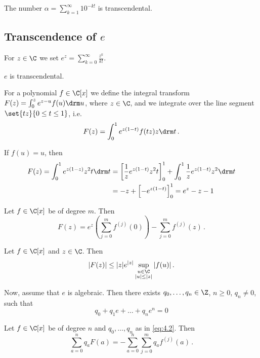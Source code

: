 \begin{thmn}
	The number \( \alpha = \sum_{k=1}^{\infty} 10^{-k!} \) is transcendental.
\end{thmn}

\subsection*{Transcendence of \( e \)}

For \( z \in \C \) we set \( e^z = \sum_{k=0}^{\infty} \frac{z^k}{k!} \).

\begin{thmn}
	\label{thm:4.8}
	\( e \) is transcendental.
\end{thmn}

For a polynomial \( f \in \C[x] \) we define the integral transform \( F(z) = \int_{0}^{z} e^{z-u} f(u) \drm u \), where \( z \in \C \), and we integrate over the line segment \( \set{tz}{0 \leq t \leq 1} \), i.e.
\[ F(z) = \int_{0}^{1} e^{z(1-t)} f(tz) z \drm t \,. \]

\begin{exmp*}
	If \( f(u) = u \), then 
	\begin{align*}
		F(z) = \int_{0}^{1} e^{z (1-z)} z^2 t \drm t &= \left[ \frac{1}{z} e^{z(1-t)} z^2 t \right]_0^1 + \int_{0}^{1} \frac{1}{z} e^{z(1-t)} z^2 \drm t\\
		&= -z + \left[ -e^{z(1-t)} \right]_0^1 = e^z - z - 1
	\end{align*}
\end{exmp*}

\begin{lem}
	Let \( f \in \C[x] \) be of degree \( m \).
	Then
	\[ F(z) = e^z \left( \sum_{j=0}^{m} f^{(j)} (0) \right) - \sum_{j=0}^{m} f^{(j)} (z) \,. \]
\end{lem}

\begin{lem}
	Let \( f \in \C[x] \) and \( z \in \C \).
	Then
	\[ |F(z)| \leq |z| e^{|z|} \sup_{\substack{u \in \C\\|u| \leq |z|}} |f(u)| \,. \]
\end{lem}

Now, assume that \( e \) is algebraic.
Then there exists \( q_0, \dotsc, q_n \in \Z \), \( n \geq 0 \), \( q_n \neq 0 \), such that 
\begin{equation}
	\label{eq:4.2}
	q_0 + q_1 e + \dots + q_n e^n = 0
\end{equation}

\begin{lem}
	Let \( f \in \C[x] \) be of degree \( n \) and \( q_0, \dotsc, q_n \) as in \eqref{eq:4.2}.
	Then
	\begin{equation}
		\label{eq:4.3}
		\sum_{a=0}^{n} q_a F(a) = -\sum_{a=0}^{n} \sum_{j=0}^{m} q_a f^{(j)} (a) \,.
	\end{equation}
\end{lem}